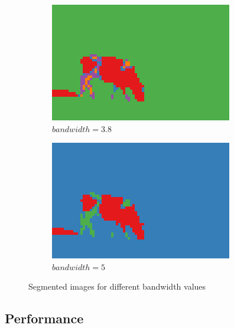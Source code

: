 \documentclass[10pt,a4paper,twoside]{article}
\newcommand{\sweepsize}{0.3}
\begin{document}
\begin{figure}[h]
    \begin{subfigure}{\sweepsize\textwidth}
    \includegraphics[width=0.9\linewidth]{result_3.8.png} 
    \caption{$bandwidth=3.8$}
    \end{subfigure}
    \begin{subfigure}{\sweepsize\textwidth}
    \includegraphics[width=0.9\linewidth]{result_5.png} 
    \caption{$bandwidth=5$}
    \end{subfigure}
    \caption{Segmented images for different bandwidth values}

\end{figure}

\subsection*{Performance}


\end{document}
